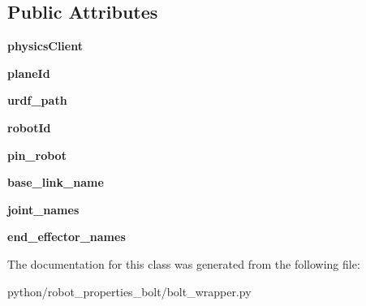 \subsection*{Public Attributes}
\begin{DoxyCompactItemize}
\item 
\mbox{\label{classrobot__properties__bolt_1_1bolt__wrapper_1_1BoltRobot_ae9ef071c3c94d387b28dd7195868cf2b}} 
{\bfseries physics\+Client}
\item 
\mbox{\label{classrobot__properties__bolt_1_1bolt__wrapper_1_1BoltRobot_aeeed18e70d5bad25ed47f179ce668e4b}} 
{\bfseries plane\+Id}
\item 
\mbox{\label{classrobot__properties__bolt_1_1bolt__wrapper_1_1BoltRobot_a3db6e1e7138a09310827f8d25fe54331}} 
{\bfseries urdf\+\_\+path}
\item 
\mbox{\label{classrobot__properties__bolt_1_1bolt__wrapper_1_1BoltRobot_a02d9fcdb5e81e374d2c91c27b884b484}} 
{\bfseries robot\+Id}
\item 
\mbox{\label{classrobot__properties__bolt_1_1bolt__wrapper_1_1BoltRobot_a097d46d9389c25aae160a5d595619d9a}} 
{\bfseries pin\+\_\+robot}
\item 
\mbox{\label{classrobot__properties__bolt_1_1bolt__wrapper_1_1BoltRobot_abe62f94e6d7cbb48294153e97b55a59e}} 
{\bfseries base\+\_\+link\+\_\+name}
\item 
\mbox{\label{classrobot__properties__bolt_1_1bolt__wrapper_1_1BoltRobot_a0e8e5c5325b4bcae1167c09ee47dc74f}} 
{\bfseries joint\+\_\+names}
\item 
\mbox{\label{classrobot__properties__bolt_1_1bolt__wrapper_1_1BoltRobot_ae09860f85eab00ed00dd49781a652be3}} 
{\bfseries end\+\_\+effector\+\_\+names}
\end{DoxyCompactItemize}


The documentation for this class was generated from the following file\+:\begin{DoxyCompactItemize}
\item 
python/robot\+\_\+properties\+\_\+bolt/bolt\+\_\+wrapper.\+py\end{DoxyCompactItemize}
